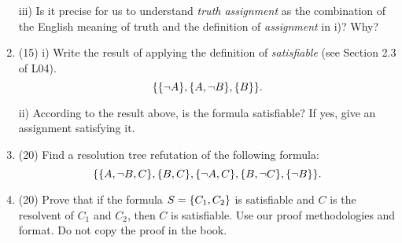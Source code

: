 \documentclass[12pt, letterpaper]{article}
\begin{document}
\begin{enumerate}
iii) Is it precise for us to understand {\em truth assignment} as the combination of the English meaning of truth and the definition of {\em assignment} in i)? Why? 


\item (15) i) Write the result of applying the definition of {\em satisfiable} (see Section 2.3 of L04). 
$$\{\{\neg A\}, \{A, \neg B\}, \{B\}\}.$$

ii) According to the result above, is the formula satisfiable? If yes, give an assignment
satisfying it. 

\item (20) Find a resolution tree refutation of 
the following formula:
$$\{\{A, \neg B, C\}, \{B, C\}, \{\neg A, C\}, \{B, \neg
C\}, \{\neg B\}\}.$$


\item (20)  Prove that if the formula $S = \{C_1, C_2\}$ is satisfiable
and $C$ is the resolvent of $C_1$ and $C_2$, then $C$ is
satisfiable. Use our proof methodologies and format. Do not
copy the proof in the book.


\end{enumerate}
\end{document}
